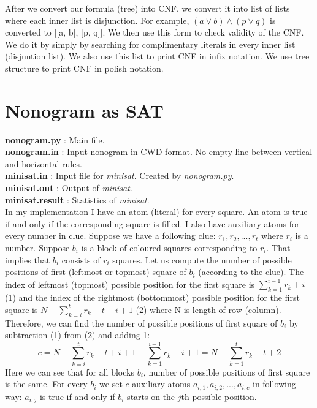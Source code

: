 \documentclass{article}
\begin{document}
After we convert our formula (tree) into CNF, we convert it into list of lists where each inner list is disjunction. For example, $(a \vee b) \wedge (p \vee q)$ is converted to [[a, b], [p, q]]. We then use this form to check validity of the CNF. We do it by simply by searching for complimentary literals in every inner list (disjuntion list). We also use this list to print CNF in infix notation. We use  tree structure to print CNF in polish notation.

\section{Nonogram as SAT}

\textbf{nonogram.py} : Main file.\\
\textbf{nonogram.in} : Input nonogram in CWD format. No empty line between vertical and horizontal rules.\\
\textbf{minisat.in} : Input file for \textit{minisat}. Created by \textit{nonogram.py}.\\
\textbf{minisat.out} : Output of \textit{minisat}.\\
\textbf{minisat.result} : Statistics of \textit{minisat}.\\

In my implementation I have an atom (literal) for every square. An atom is true if and only if the corresponding square is filled. I also have auxiliary atoms for every number in clue. Suppose we have a following clue: $r_1, r_2, ..., r_t$ where $r_i$ is a number. Suppose $b_i$ is a block of coloured squares corresponding to $r_i$. That implies that $b_i$ consists of $r_i$ squares. Let us compute the number of possible positions of first (leftmost or topmost) square of $b_i$ (according to the clue). The index of leftmost (topmost) possible position for the first square is $\sum_{k=1}^{i-1} r_k + i$ (1) and the index of the rightmost (bottommost) possible position for the first square is $N - \sum_{k=i}^{t} r_k - t + i + 1$ (2) where N is length of row (column). Therefore, we can find the number of possible positions of first square of $b_i$ by subtraction (1) from (2) and adding 1:
$$c = N - \sum_{k=i}^{t} r_k - t + i + 1 - \sum_{k=1}^{i-1} r_k - i + 1 = N - \sum_{k=1}^{t} r_k - t + 2$$
Here we can see that for all blocks $b_i$, number of possible positions of first square is the same. For every $b_i$ we set $c$ auxiliary atoms $a_{i,1}, a_{i,2}, ..., a_{i,c}$ in following way: $a_{i,j}$ is true if and only if $b_i$ starts on the $j$th possible position.
\end{document}
